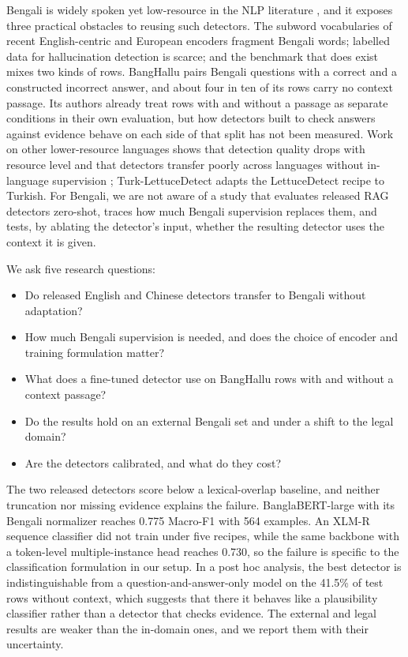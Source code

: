 \documentclass[manuscript,screen,review]{acmart}
\begin{document}
Bengali is widely spoken yet low-resource in the NLP literature \cite{bhattacharjee2022banglabert}, and it exposes three practical obstacles to reusing such detectors. The subword vocabularies of recent English-centric and European encoders fragment Bengali words; labelled data for hallucination detection is scarce; and the benchmark that does exist mixes two kinds of rows. BangHallu \cite{banghalluRepo} pairs Bengali questions with a correct and a constructed incorrect answer, and about four in ten of its rows carry no context passage. Its authors already treat rows with and without a passage as separate conditions in their own evaluation, but how detectors built to check answers against evidence behave on each side of that split has not been measured. Work on other lower-resource languages shows that detection quality drops with resource level \cite{ralethe2026multihallsa,abdaljalil2026halluverse} and that detectors transfer poorly across languages without in-language supervision \cite{datta2026lowresource}; Turk-LettuceDetect \cite{tas2025turk} adapts the LettuceDetect recipe to Turkish. For Bengali, we are not aware of a study that evaluates released RAG detectors zero-shot, traces how much Bengali supervision replaces them, and tests, by ablating the detector's input, whether the resulting detector uses the context it is given.

We ask five research questions:
\begin{itemize}
\item[\textbf{RQ1:}] Do released English and Chinese detectors transfer to Bengali without adaptation?
\item[\textbf{RQ2:}] How much Bengali supervision is needed, and does the choice of encoder and training formulation matter?
\item[\textbf{RQ3:}] What does a fine-tuned detector use on BangHallu rows with and without a context passage?
\item[\textbf{RQ4:}] Do the results hold on an external Bengali set and under a shift to the legal domain?
\item[\textbf{RQ5:}] Are the detectors calibrated, and what do they cost?
\end{itemize}

The two released detectors score below a lexical-overlap baseline, and neither truncation nor missing evidence explains the failure. BanglaBERT-large \cite{bhattacharjee2022banglabert} with its Bengali normalizer reaches 0.775 Macro-F1 with 564 examples. An XLM-R sequence classifier \cite{conneau2020xlmr} did not train under five recipes, while the same backbone with a token-level multiple-instance head reaches 0.730, so the failure is specific to the classification formulation in our setup. In a post hoc analysis, the best detector is indistinguishable from a question-and-answer-only model on the 41.5\% of test rows without context, which suggests that there it behaves like a plausibility classifier rather than a detector that checks evidence. The external and legal results are weaker than the in-domain ones, and we report them with their uncertainty.
\end{document}
